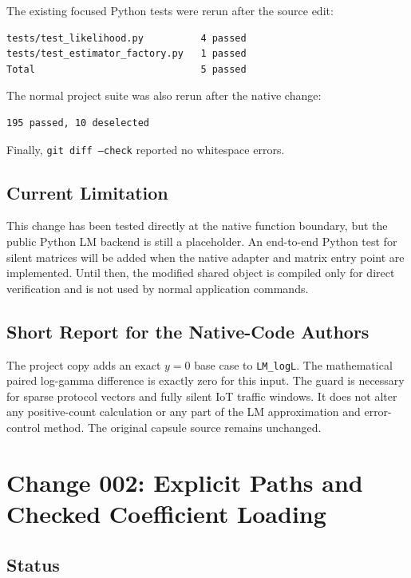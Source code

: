 \documentclass[11pt,a4paper]{article}
\begin{document}
The existing focused Python tests were rerun after the source edit:

\begin{verbatim}
tests/test_likelihood.py          4 passed
tests/test_estimator_factory.py   1 passed
Total                             5 passed
\end{verbatim}

The normal project suite was also rerun after the native change:

\begin{verbatim}
195 passed, 10 deselected
\end{verbatim}

Finally, \texttt{git diff --check} reported no whitespace errors.

\subsection{Current Limitation}

This change has been tested directly at the native function boundary, but the
public Python LM backend is still a placeholder. An end-to-end Python test for
silent matrices will be added when the native adapter and matrix entry point are
implemented. Until then, the modified shared object is compiled only for direct
verification and is not used by normal application commands.

\subsection{Short Report for the Native-Code Authors}

The project copy adds an exact \(y=0\) base case to
\texttt{LM\_logL}. The mathematical paired log-gamma difference is exactly zero
for this input. The guard is necessary for sparse protocol vectors and fully
silent IoT traffic windows. It does not alter any positive-count calculation or
any part of the LM approximation and error-control method. The original capsule
source remains unchanged.

\section{Change 002: Explicit Paths and Checked Coefficient Loading}

\subsection{Status}
\end{document}

